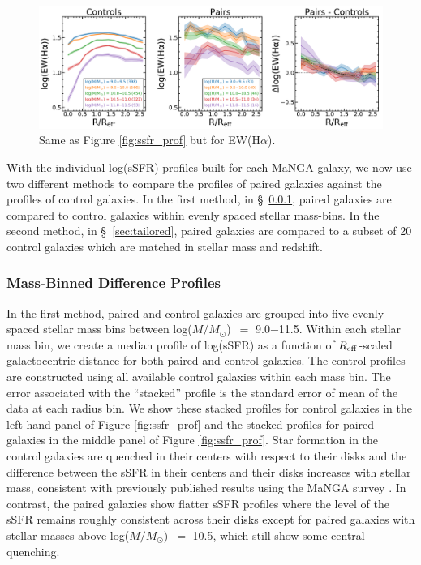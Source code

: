 \documentclass[iop,revtex4,twocolumn,apj,numberedappendix,appendixfloats]{emulateapj}
\newcommand{\reff}{$R_{\rm eff}$}
\newcommand{\logm}{log($M/M_{\odot}$)}
\begin{document}
\begin{figure}
\centering
\includegraphics[width=\linewidth]{fig/ewha_comb.pdf}
\caption[]{Same as Figure \ref{fig:ssfr_prof} but for EW(H$\alpha$). }
\label{fig:ewha_prof}
\end{figure}

With the individual log(sSFR) profiles built for each MaNGA galaxy, we now use two different methods to compare the profiles of paired galaxies against the profiles of control galaxies. In the first method, in \S~\ref{sec:mass-bin}, paired galaxies are compared to control galaxies within evenly spaced stellar mass-bins. In the second method, in \S~\ref{sec:tailored}, paired galaxies are compared to a subset of 20 control galaxies which are matched in stellar mass and redshift. 

\subsubsection{Mass-Binned Difference Profiles}\label{sec:mass-bin}

In the first method, paired and control galaxies are grouped into five evenly spaced stellar mass bins between \logm\ $=$ 9.0$-$11.5. Within each stellar mass bin, we create a median profile of log(sSFR) as a function of \reff-scaled galactocentric distance for both paired and control galaxies. The control profiles are constructed using all available control galaxies within each mass bin. The error associated with the ``stacked'' profile is the standard error of mean of the data at each radius bin. We show these stacked profiles for control galaxies in the left hand panel of Figure \ref{fig:ssfr_prof} and the stacked profiles for paired galaxies in the middle panel of Figure \ref{fig:ssfr_prof}. Star formation in the control galaxies are quenched in their centers with respect to their disks and the difference between the sSFR in their centers and their disks increases with stellar mass, consistent with previously published results using the MaNGA survey \citep{Belfiore:2018}. In contrast, the paired galaxies show flatter sSFR profiles where the level of the sSFR remains roughly consistent across their disks except for paired galaxies with stellar masses above \logm\ $=$ 10.5, which still show some central quenching. 
\end{document}
